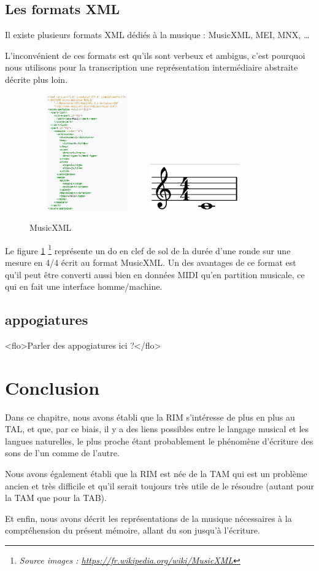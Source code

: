 \subsection*{Les formats XML}
Il existe plusieurs formats XML dédiés à la musique : MusicXML, MEI, MNX, …

L’inconvénient de ces formats est qu’ils sont verbeux et ambigus, c’est
pourquoi nous utilisons pour la transcription une représentation intermédiaire
abstraite décrite plus loin.


\begin{figure}[h]
	\centering
	\includegraphics[height=50mm, width=50mm]{
    z_images/1_contexte/6_musicxml_0.png}
    \includegraphics[height=20mm, width=40mm]{
    z_images/1_contexte/6_musicxml_1.png}
	\caption{MusicXML} 
	\label{MusicXML}
\end{figure}

Le figure \ref{MusicXML}
\footnote{\textit{Source images :
\url{https://fr.wikipedia.org/wiki/MusicXML}}}
représente un do en clef de sol de la durée d’une ronde sur une mesure en 4/4
écrit au format MusicXML.
Un des avantages de ce format est qu’il peut être converti aussi bien en
données MIDI qu’en partition musicale, ce qui en fait une interface
homme/machine.

\subsection*{appogiatures}
<flo>Parler des appogiatures ici ?</flo>

\section*{Conclusion}
Dans ce chapitre, nous avons établi que la RIM s’intéresse de plus en plus au
TAL, et que, par ce biais, il y a des liens possibles entre le langage musical
et les langues naturelles, le plus proche étant probablement le phénomène
d’écriture des sons de l’un comme de l’autre.

Nous avons également établi que la RIM est née de la TAM qui est un problème
ancien et très difficile et qu’il serait toujours très utile de le résoudre
(autant pour la TAM que pour la TAB).

Et enfin, nous avons décrit les représentations de la musique nécessaires à la
compréhension du présent mémoire, allant du son jusqu’à l’écriture.
